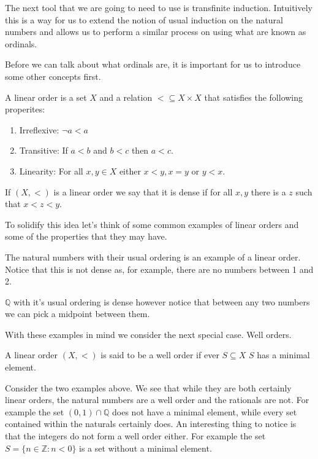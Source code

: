 The next tool that we are going to need to use is transfinite induction.
Intuitively this is a way for us to extend the notion of usual induction on the
natural numbers and allows us to perform a similar process on using what are
known as ordinals.

Before we can talk about what ordinals are, it is important for us to introduce
some other concepts first.

\begin{defn}
  A linear order is a set $X$ and a relation $< \subseteq X \times X$ that
  satisfies the following properites:
  \begin{enumerate}
    \item Irreflexive: $\neg a < a$
    \item Transitive: If $a < b$ and $b < c$ then $a < c$.
    \item Linearity: For all $x,y \in X$ either $x < y, x = y$ or $y < x$.
  \end{enumerate}

  If $(X, <)$ is a linear order we say that it is dense if for all $x, y$ there
  is a $z$ such that $x < z < y$.
\end{defn}

To solidify this idea let's think of some common examples of linear orders and
some of the properties that they may have. 

\begin{ex}
  The natural numbers with their usual ordering is an example of a linear
  order. Notice that this is not dense as, for example, there are no numbers
  between 1 and 2.
\end{ex}
\begin{ex}
  $\mathbb{Q}$ with it's usual ordering is dense however notice that between
  any two numbers we can pick a midpoint between them.
\end{ex}

With these examples in mind we consider the next special case. Well orders.

\begin{defn}
  A linear order $(X, <)$ is said to be a well order if ever $S \subseteq X$
  $S$ has a minimal element.
\end{defn}

Consider the two examples above. We see that while they are both certainly
linear orders, the natural numbers are a well order and the rationals are
not. For example the set $(0,1) \cap \mathbb{Q}$ does not have a minimal
element, while every set contained within the naturals certainly does. An
interesting thing to notice is that the integers do not form a well order
either. For example the set $S = \{n \in \mathbb{Z}: n < 0\}$ is a set without
a minimal element.

